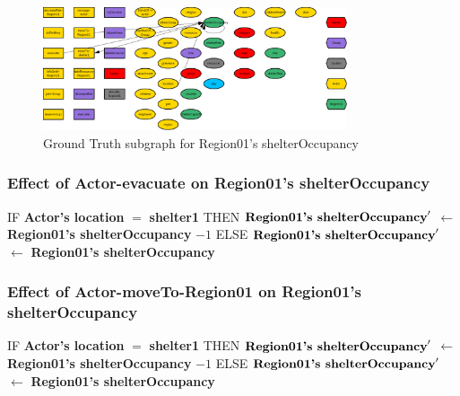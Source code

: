 \documentclass{article}%
\begin{document}
\begin{figure}[ht]%
\centering%
\includegraphics[width=0.8\textwidth]{images/shelterOccupancyOfRegion01.png}%
\caption{Ground Truth subgraph for Region01's shelterOccupancy}%
\end{figure}

%
\subsubsection{Effect of Actor{-}evacuate on Region01's shelterOccupancy}%
\label{ssubsec:Effect of Actor{-}evacuate on Region01's shelterOccupancy}%
\begin{flushleft}%
IF %
\textbf{Actor's location}%
$=$%
\textbf{shelter1}%
\linebreak%
\hspace*{2em}%
THEN %
$\mbox{\textbf{Region01's shelterOccupancy}} '$%
$\leftarrow$%
\textbf{Region01's shelterOccupancy}%
${-}1$%
\linebreak%
\hspace*{2em}%
ELSE %
$\mbox{\textbf{Region01's shelterOccupancy}} '$%
$\leftarrow$%
\textbf{Region01's shelterOccupancy}%
\end{flushleft}

%
\subsubsection{Effect of Actor{-}moveTo{-}Region01 on Region01's shelterOccupancy}%
\label{ssubsec:Effect of Actor{-}moveTo{-}Region01 on Region01's shelterOccupancy}%
\begin{flushleft}%
IF %
\textbf{Actor's location}%
$=$%
\textbf{shelter1}%
\linebreak%
\hspace*{2em}%
THEN %
$\mbox{\textbf{Region01's shelterOccupancy}} '$%
$\leftarrow$%
\textbf{Region01's shelterOccupancy}%
${-}1$%
\linebreak%
\hspace*{2em}%
ELSE %
$\mbox{\textbf{Region01's shelterOccupancy}} '$%
$\leftarrow$%
\textbf{Region01's shelterOccupancy}%
\end{flushleft}
\end{document}
